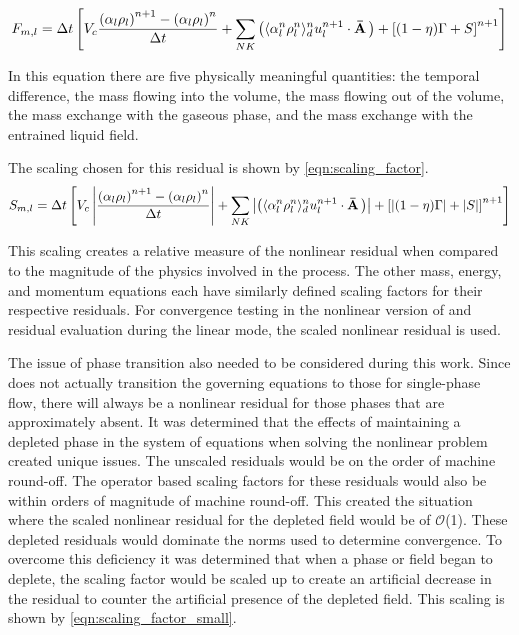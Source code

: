 \begin{equation}
\label{eqn:res_mass_liq}
F_{m,l} = \Delta t \left[ V_c \frac{\left(\alpha_l \rho_l \right)^{n+1} - \left(\alpha_l \rho_l \right)^{n}}{\Delta t} + \sum_{NK}\left( \don{\alpha^n_l \rho^n_l}^{n}_{d} u^{n+1}_l  \cdot \vec{\bar{A}}\right) + \left[(1-\eta)\Gamma + S \right]^{n+1}\right]
\end{equation}

In this equation there are five physically meaningful quantities: the temporal difference, the mass flowing into the volume, the mass flowing out of the volume, the mass exchange with the gaseous phase, and the mass exchange with the entrained liquid field.

The scaling chosen for this residual is shown by \eqref{eqn:scaling_factor}.
\begin{equation}
\label{eqn:scaling_factor}
S_{m,l} = \Delta t \left[ V_c \abs{\frac{\left(\alpha_l \rho_l \right)^{n+1} - \left(\alpha_l \rho_l \right)^{n}}{\Delta t}} + \sum_{NK}\abs{\left( \don{\alpha^n_l \rho^n_l}^{n}_{d} u^{n+1}_l  \cdot \vec{\bar{A}}\right)} + \left[\abs{(1-\eta)\Gamma} + \abs{S} \right]^{n+1}\right]
\end{equation}

This scaling creates a relative measure of the nonlinear residual when compared to the magnitude of the physics involved in the process.
The other mass, energy, and momentum equations each have similarly defined scaling factors for their respective residuals.
For convergence testing in the nonlinear version of \cobra{} and residual evaluation during the linear mode, the scaled nonlinear residual is used.

The issue of phase transition also needed to be considered during this work.
Since \cobra{} does not actually transition the governing equations to those for single-phase flow, there will always be a nonlinear residual for those phases that are approximately absent.
It was determined that the effects of maintaining a depleted phase in the system of equations when solving the nonlinear problem created unique issues.
The unscaled residuals would be on the order of machine round-off.
The operator based scaling factors for these residuals would also be within orders of magnitude of machine round-off.
This created the situation where the scaled nonlinear residual for the depleted field would be of $\mathcal{O}$(1).
These depleted residuals would dominate the norms used to determine convergence.
To overcome this deficiency it was determined that when a phase or field began to deplete, the scaling factor would be scaled up to create an artificial decrease in the residual to counter the artificial presence of the depleted field.
This scaling is shown by \eqref{eqn:scaling_factor_small}.

